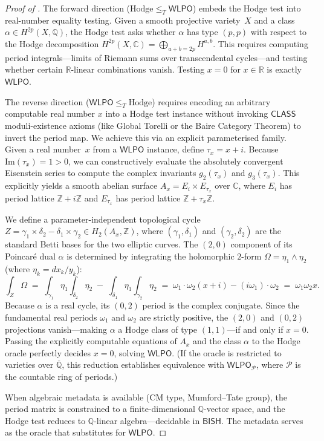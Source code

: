 \documentclass[11pt]{article}
\theoremstyle{plain}
\theoremstyle{definition}
\theoremstyle{remark}
\newcommand{\ZZ}{\mathbb{Z}}
\newcommand{\QQ}{\mathbb{Q}}
\newcommand{\CC}{\mathbb{C}}
\newcommand{\RR}{\mathbb{R}}
\newcommand{\BISH}{\mathsf{BISH}}
\newcommand{\WLPO}{\mathsf{WLPO}}
\newcommand{\CLASS}{\mathsf{CLASS}}
\begin{document}
\begin{proof}[Proof of ]
The forward direction ($\text{Hodge} \le_T \WLPO$) embeds the
Hodge test into real-number equality testing.  Given a smooth
projective variety~$X$ and a class
$\alpha \in H^{2p}(X, \QQ)$, the Hodge test asks whether $\alpha$
has type $(p,p)$ with respect to the Hodge decomposition
$H^{2p}(X, \CC) = \bigoplus_{a+b=2p} H^{a,b}$.  This requires
computing period integrals---limits of Riemann sums over
transcendental cycles---and testing whether certain $\RR$-linear
combinations vanish.  Testing $x = 0$ for $x \in \RR$ is exactly
$\WLPO$.

The reverse direction ($\WLPO \le_T \text{Hodge}$) requires
encoding an arbitrary computable real number $x$ into a Hodge test
instance without invoking $\CLASS$ moduli-existence axioms (like
Global Torelli or the Baire Category Theorem) to invert the period
map.  We achieve this via an explicit parameterised family.  Given a
real number~$x$ from a $\WLPO$ instance, define $\tau_x = x+i$.
Because $\mathrm{Im}(\tau_x) = 1 > 0$, we can constructively
evaluate the absolutely convergent Eisenstein series to compute the
complex invariants $g_2(\tau_x)$ and $g_3(\tau_x)$.  This
explicitly yields a smooth abelian surface
$A_x = E_i \times E_{\tau_x}$ over $\CC$, where $E_i$ has period
lattice $\ZZ + i\ZZ$ and $E_{\tau_x}$ has period lattice
$\ZZ + \tau_x\ZZ$.

We define a parameter-independent topological cycle
$Z = \gamma_1 \times \delta_2 - \delta_1 \times \gamma_2
\in H_2(A_x, \ZZ)$, where $(\gamma_1, \delta_1)$ and
$(\gamma_2, \delta_2)$ are the standard Betti bases for the two
elliptic curves.  The $(2,0)$ component of its Poincar\'e dual
$\alpha$ is determined by integrating the holomorphic $2$-form
$\Omega = \eta_1 \wedge \eta_2$ (where $\eta_k = dx_k/y_k$):
\[
  \int_Z \Omega \;=\;
  \int_{\gamma_1} \eta_1 \int_{\delta_2} \eta_2
  \;-\; \int_{\delta_1} \eta_1 \int_{\gamma_2} \eta_2
  \;=\; \omega_1 \cdot \omega_2(x+i) - (i\omega_1) \cdot \omega_2
  \;=\; \omega_1 \omega_2 x.
\]
Because $\alpha$ is a real cycle, its $(0,2)$ period is the complex
conjugate.  Since the fundamental real periods $\omega_1$ and
$\omega_2$ are strictly positive, the $(2,0)$ and $(0,2)$
projections vanish---making $\alpha$ a Hodge class of type
$(1,1)$---if and only if $x = 0$.  Passing the explicitly
computable equations of $A_x$ and the class $\alpha$ to the Hodge
oracle perfectly decides $x = 0$, solving $\WLPO$.  (If the oracle
is restricted to varieties over $\overline{\QQ}$, this reduction
establishes equivalence with $\WLPO_{\mathcal{P}}$, where
$\mathcal{P}$ is the countable ring of periods.)

When algebraic metadata is available (CM type, Mumford--Tate
group), the period matrix is constrained to a finite-dimensional
$\QQ$-vector space, and the Hodge test reduces to $\QQ$-linear
algebra---decidable in $\BISH$.  The metadata serves as the oracle
that substitutes for $\WLPO$.
\end{proof}
\end{document}
